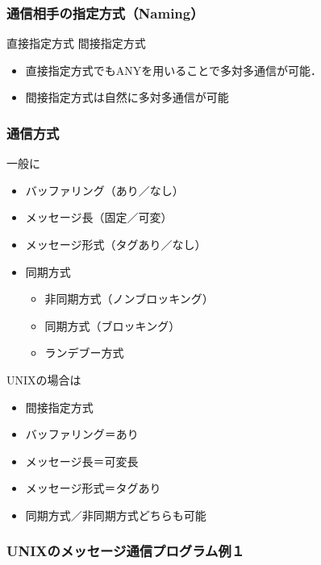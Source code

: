 \documentclass{beamer}                   %
\begin{document}
\begin{frame}
  \frametitle{通信相手の指定方式（Naming）}
  \begin{center}
    直接指定方式
    間接指定方式
  \end{center}
  \begin{itemize}
  \item 直接指定方式でもANYを用いることで多対多通信が可能．
  \item 間接指定方式は自然に多対多通信が可能
  \end{itemize}
\end{frame}

\begin{frame}
  \frametitle{通信方式}
  一般に
  \begin{itemize}
  \item バッファリング（あり／なし）
  \item メッセージ長（固定／可変）
  \item メッセージ形式（タグあり／なし）
  \item 同期方式
    \begin{itemize}
    \item 非同期方式（ノンブロッキング）
    \item 同期方式（ブロッキング）
    \item ランデブー方式
    \end{itemize}
  \end{itemize}

  UNIXの場合は
  \begin{itemize}
  \item 間接指定方式
  \item バッファリング＝あり
  \item メッセージ長＝可変長
  \item メッセージ形式＝タグあり
  \item 同期方式／非同期方式どちらも可能
  \end{itemize}
\end{frame}

\begin{frame}
  \frametitle{UNIXのメッセージ通信プログラム例１}
\end{frame}
\end{document}
